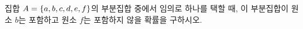 집합 $A=\{a{,}\mkern3mu\mathopen{}b{,}\mkern3mu\mathopen{}c{,}\mkern3mu\mathopen{}d{,}\mkern3mu\mathopen{}e{,}\mkern3mu\mathopen{}f\}$의 부분집합 중에서 임의로 하나를 택할 때, 이 부분집합이 원소 $b$는 포함하고 원소 $f$는 포함하지 않을 확률을 구하시오.
